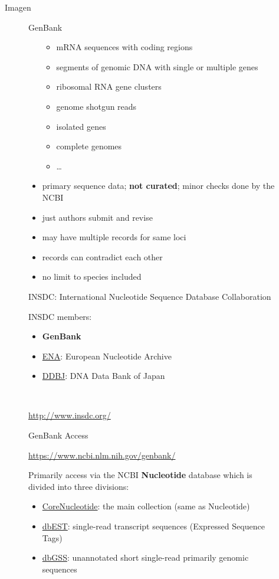 \begin{frame}{Imagen}
\begin{figure}[htbp]
\begin{frame}{GenBank}
\begin{itemize}
  \begin{itemize}
  \itemsep1pt\parskip0pt
  \item
    mRNA sequences with coding regions
  \item
    segments of genomic DNA with single or multiple genes
  \item
    ribosomal RNA gene clusters
  \item
    genome shotgun reads
  \item
    isolated genes
  \item
    complete genomes
  \item
    \ldots{}
  \end{itemize}
\item
  primary sequence data; \textbf{not curated}; minor checks done by the
  NCBI
\item
  just authors submit and revise
\item
  may have multiple records for same loci
\item
  records can contradict each other
\item
  no limit to species included
\end{itemize}

\end{frame}

\begin{frame}{INSDC: International Nucleotide Sequence Database
Collaboration}

INSDC members:

\begin{itemize}
\itemsep1pt\parskip0pt
\item
  \textbf{GenBank}
\item
  \href{http://www.ebi.ac.uk/ena/}{ENA}: European Nucleotide Archive
\item
  \href{http://www.ddbj.nig.ac.jp/}{DDBJ}: DNA Data Bank of Japan
\end{itemize}

~

\url{http://www.insdc.org/}

\end{frame}

\begin{frame}{GenBank Access}

\url{https://www.ncbi.nlm.nih.gov/genbank/}

Primarily access via the NCBI \textbf{Nucleotide} database which is
divided into three divisions:

\begin{itemize}
\itemsep1pt\parskip0pt
\item
  \href{https://www.ncbi.nlm.nih.gov/nuccore/}{CoreNucleotide}: the main
  collection (same as Nucleotide)
\item
  \href{https://www.ncbi.nlm.nih.gov/nucest/}{dbEST}: single-read
  transcript sequences (Expressed Sequence Tags)
\item
  \href{https://www.ncbi.nlm.nih.gov/nucgss/}{dbGSS}: unannotated short
  single-read primarily genomic sequences
\end{itemize}


\end{frame}
\end{figure}
\end{frame}
